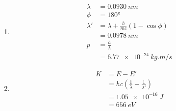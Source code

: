 \documentclass{article}
\begin{document}
\begin{enumerate}
  \item

        \begin{align*}
          \lambda  & = \qty{0.0930}{nm}                        \\
          \phi     & = \ang{180}                               \\
          \lambda' & = \lambda + \frac{h}{m c} (1 - \cos \phi) \\
                   & = \qty{0.0978}{nm}                        \\
          p        & = \frac{h}{\lambda}                       \\
                   & = \qty{6.77e-24}{kg.m/s}
        \end{align*}

  \item

        \begin{align*}
          K & = E - E'                                                    \\
            & = h c \left( \frac{1}{\lambda} - \frac{1}{\lambda'} \right) \\
            & = \qty{1.05e-16}{J}                                         \\
            & = \qty{656}{eV}
        \end{align*}
\end{enumerate}

\setcounter{subsubsection}{30}
\subsubsection{}
\end{document}
